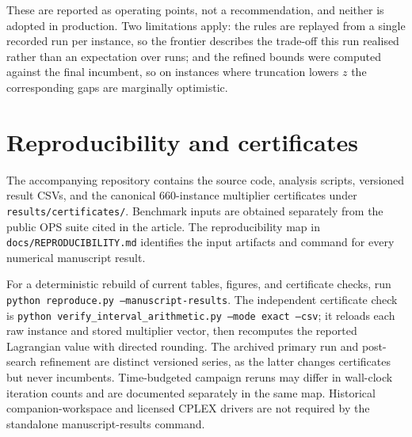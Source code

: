 \documentclass[11pt]{article}
\begin{document}
These are reported as operating points, not a recommendation, and neither is
adopted in production. Two limitations apply: the rules are replayed from a
single recorded run per instance, so the frontier describes the trade-off this
run realised rather than an expectation over runs; and the refined bounds were
computed against the final incumbent, so on instances where truncation lowers
$z$ the corresponding gaps are marginally optimistic.

\section{Reproducibility and certificates}

The accompanying repository contains the source code, analysis scripts,
versioned result CSVs, and the canonical 660-instance multiplier certificates
under \texttt{results/certificates/}. Benchmark inputs are obtained separately
from the public OPS suite cited in the article. The reproducibility map in
\texttt{docs/REPRODUCIBILITY.md} identifies the input artifacts and command for
every numerical manuscript result.

For a deterministic rebuild of current tables, figures, and certificate checks,
run \texttt{python reproduce.py --manuscript-results}. The independent
certificate check is \texttt{python verify\_interval\_arithmetic.py --mode exact
--csv}; it reloads each raw instance and stored multiplier vector, then
recomputes the reported Lagrangian value with directed rounding. The archived
primary run and post-search refinement are distinct versioned series, as the
latter changes certificates but never incumbents. Time-budgeted campaign reruns
may differ in wall-clock iteration counts and are documented separately in the
same map. Historical companion-workspace and licensed CPLEX drivers are not
required by the standalone manuscript-results command.



\end{document}
